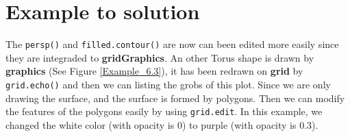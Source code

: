 \documentclass[paper=a4, fontsize=11pt]{report}
\begin{document}
% 
% 
% 
% 

\section{Example to solution}
The \texttt{persp()} and \texttt{filled.contour()} are now can been edited more easily since they are integraded to \textbf{gridGraphics}. An other Torus shape is drawn by \textbf{graphics} (See Figure \ref{Example_6.3}), it has been redrawn on \textbf{grid} by \texttt{grid.echo()} and then we can listing the grobs of this plot. Since we are only drawing the surface, and the surface is formed by polygons. Then we can modify the features of the polygons easily by using \texttt{grid.edit}. In this example, we changed the white color (with opacity is 0) to purple (with opacity is 0.3).\\
\end{document}
